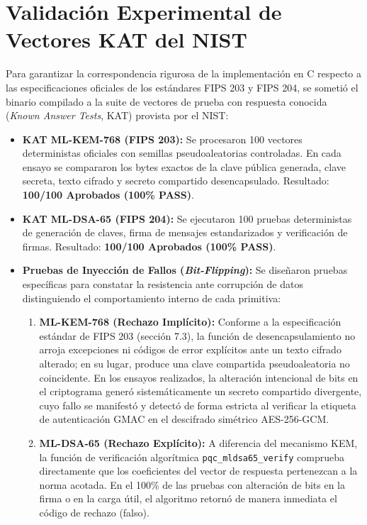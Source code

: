 \section{Validación Experimental de Vectores KAT del NIST}
\label{sec:validacion_kat}

Para garantizar la correspondencia rigurosa de la implementación en C respecto a las especificaciones oficiales de los estándares FIPS 203 y FIPS 204, se sometió el binario compilado a la suite de vectores de prueba con respuesta conocida (\textit{Known Answer Tests}, KAT) provista por el NIST:
\begin{itemize}
	\item \textbf{KAT ML-KEM-768 (FIPS 203):} Se procesaron 100 vectores deterministas oficiales con semillas pseudoaleatorias controladas. En cada ensayo se compararon los bytes exactos de la clave pública generada, clave secreta, texto cifrado y secreto compartido desencapsulado. Resultado: \textbf{100/100 Aprobados (100\% PASS)}.
	\item \textbf{KAT ML-DSA-65 (FIPS 204):} Se ejecutaron 100 pruebas deterministas de generación de claves, firma de mensajes estandarizados y verificación de firmas. Resultado: \textbf{100/100 Aprobados (100\% PASS)}.
	\item \textbf{Pruebas de Inyección de Fallos (\textit{Bit-Flipping}):} Se diseñaron pruebas específicas para constatar la resistencia ante corrupción de datos distinguiendo el comportamiento interno de cada primitiva:
	\begin{enumerate}
		\item \textbf{ML-KEM-768 (Rechazo Implícito):} Conforme a la especificación estándar de FIPS 203 (sección 7.3), la función de desencapsulamiento no arroja excepciones ni códigos de error explícitos ante un texto cifrado alterado; en su lugar, produce una clave compartida pseudoaleatoria no coincidente. En los ensayos realizados, la alteración intencional de bits en el criptograma generó sistemáticamente un secreto compartido divergente, cuyo fallo se manifestó y detectó de forma estricta al verificar la etiqueta de autenticación GMAC en el descifrado simétrico AES-256-GCM.
		\item \textbf{ML-DSA-65 (Rechazo Explícito):} A diferencia del mecanismo KEM, la función de verificación algorítmica \texttt{pqc\_mldsa65\_verify} comprueba directamente que los coeficientes del vector de respuesta pertenezcan a la norma acotada. En el 100\% de las pruebas con alteración de bits en la firma o en la carga útil, el algoritmo retornó de manera inmediata el código de rechazo (falso).
	\end{enumerate}
\end{itemize}
